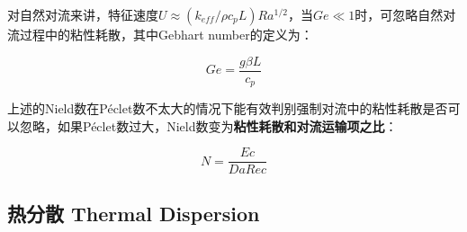 对自然对流来讲，特征速度$ U\approx (k_{eff}/\rho c_p L)Ra^{1/2} $，当$ Ge \ll 1 $时，可忽略自然对流过程中的粘性耗散，其中Gebhart number的定义为：

\[ Ge = \frac{g\beta L}{c_p} \]

上述的Nield数在P\'{e}clet数不太大的情况下能有效判别强制对流中的粘性耗散是否可以忽略，如果P\'{e}clet数过大，Nield数变为\textbf{粘性耗散和对流运输项之比}：

\[N = \frac{Ec}{DaRec}\]

\subsection{热分散 Thermal Dispersion}



